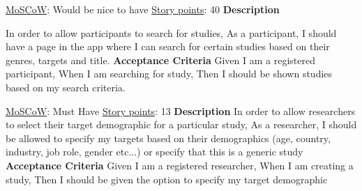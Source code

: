 \documentclass[12pt, a4paper]{report}
\begin{document}
\vspace*{20px}

\begin{tcolorbox}[width=\textwidth,colback={White},title={\textbf {Study Search}},colbacktitle=grey,coltitle=black]
\underline{MoSCoW}: Would be nice to have
\hfill
\underline {Story points}: 40
\newline
\newline
\blindtext \textbf{Description}
\newline

In order to allow participants to search for studies, \newline
As a participant, \newline
I should have a page in the app where I can search for certain studies based on their genres, targets and title.\newline
\newline
 \textbf{Acceptance Criteria}
 \newline
Given I am a registered participant,\newline
When I am searching for study, \newline
Then I should be shown studies based on my search criteria. \newline
\end{tcolorbox}  

\vspace*{20px}

\begin{tcolorbox}[width=\textwidth,colback={White},title={\textbf {Study target demographics}},colbacktitle=grey,coltitle=black]
\underline{MoSCoW}: Must Have
\hfill
\underline {Story points}: 13
\newline
\newline
\blindtext \textbf{Description}
\newline
In order to allow researchers to select their target demographic for a particular study, \newline
As a researcher, \newline
I should be allowed to specify my targets based on their demographics (age, country, industry, job role, gender etc...) or specify that this is a generic study \newline \newline
 \textbf{Acceptance Criteria}
 \newline
Given I am a registered researcher, \newline
When I am creating a study, \newline
Then I should be given the option to specify my target demographic \newline
\end{tcolorbox}  
\end{document}

